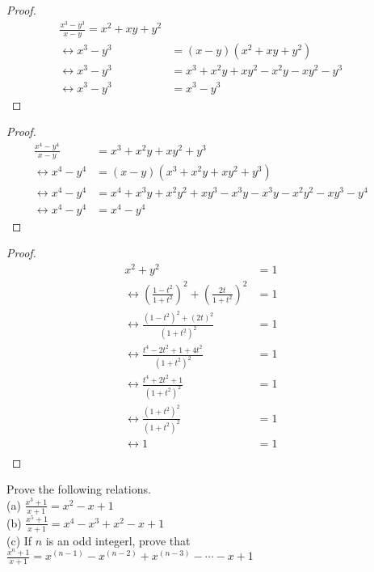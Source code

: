 \begin{proof}
\begin{align*}
\frac{x^3 - y^3}{x - y} = x^2 + xy + y^2 && \\
\leftrightarrow x^3 - y^3 &= (x - y)(x^2 + xy + y^2) && \\
\leftrightarrow x^3 - y^3 &= x^3 + x^2y + xy^2 - x^2y - xy^2 - y^3 && \\
\leftrightarrow x^3 - y^3 &= x^3 - y^3
\end{align*}
\end{proof}
\begin{proof}
\begin{align*}
\frac{x^4 - y^4}{x - y} &= x^3 + x^2y + xy^2 + y^3 && \\
\leftrightarrow x^4 - y^4 &= (x - y)(x^3 + x^2y + xy^2 + y^3) && \\
\leftrightarrow x^4 - y^4 &= x^4 + x^3y + x^2y^2 + xy^3 - x^3y - x^3y - x^2y^2 - xy^3 - y^4 && \\
\leftrightarrow x^4 - y^4 &= x^4 - y^4
\end{align*}
\end{proof}
\begin{proof}
\begin{align*}
x^2 + y^2 &= 1 && \\
\leftrightarrow {\left(\frac{1 - t^2}{1 + t^2}\right)}^2 
    + {\left(\frac{2t}{1 + t^2}\right)}^2 &= 1 && \\
    \leftrightarrow \frac{{(1 - t^2)}^2 + {(2t)}^2}{{(1 + t^2)}^2} &= 1 && \\
    \leftrightarrow \frac{t^4 - 2t^2 + 1 + 4t^2}{{(1 + t^2)}^2} &= 1 && \\
    \leftrightarrow \frac{t^4 + 2t^2 + 1}{{(1 + t^2)}^2} &= 1 && \\
    \leftrightarrow \frac{{(1 + t^2)}^2}{{(1 + t^2)}^2} &= 1 && \\
    \leftrightarrow 1 &= 1 && \\
\end{align*}
\end{proof}


\begin{tcolorbox}[title=Problem 5, breakable]
Prove the following relations. \\
(a) $\frac{x^3 + 1}{x + 1} = x^2 - x + 1$ \\
(b) $\frac{x^5 + 1}{x + 1} = x^4 - x^3 + x^2 - x + 1$ \\
(c) If $n$ is an odd integerl, prove that \\
$\frac{x^n + 1}{x + 1} = x^{(n - 1)} - x^{(n - 2)} + x^{(n - 3)} - \cdots -x + 1$
\end{tcolorbox}

